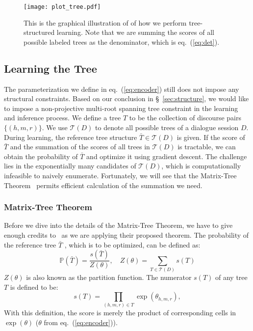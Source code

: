 \documentclass[11pt]{article}
\begin{document}
\begin{figure*}[]
\vspace{-0.8cm}
\texttt{[image: plot\_tree.pdf]}
\vspace{-0.8cm}
\caption{This is the graphical illustration of of how we perform tree-structured learning. Note that we are summing the scores of all possible labeled trees as the denominator, which is eq.~(\ref{eq:det}).}
\label{fig:tree_encoding}
\end{figure*}

\subsection{Learning the Tree}
\label{sec:learning}
The parameterization we define in eq.~(\ref{eq:encoder}) still does not impose any structural constraints. Based on our conclusion in \S~\ref{sec:structure}, we would like to impose a non-projective multi-root spanning tree constraint in the learning and inference process.
We define a tree $T$ to be the collection of discourse pairs $\{(h,m,r)\}$.
We use $\mathcal{T}(D)$ to denote all possible trees of a dialogue session $D$. During learning, the reference tree structure $\bar T\in \mathcal{T}(D)$ is given. If the score of $\bar T$ and the summation of the scores of all trees in $\mathcal{T}(D)$ is tractable, we can obtain the probability of $\bar T$ and optimize it using gradient descent.
The challenge lies in the exponentially many candidates of $\mathcal{T}(D)$, which is computationally infeasible to naively enumerate.
Fortunately, we will see that the Matrix-Tree Theorem~\cite{tutte1984graph,koo2007structured} permits efficient calculation of the summation we need.

\subsubsection{Matrix-Tree Theorem}
Before we dive into the details of the Matrix-Tree Theorem, we have to give enough credits to~\citet{tutte1984graph, koo2007structured} as we are applying their proposed theorem.
The probability of the reference tree $\bar T$ , which is to be optimized, can be defined as:
\begin{equation}
    \mathbb{P}(\bar T) = \frac{s(\bar T)}{Z(\theta)}, \quad Z(\theta) = \sum_{T\in \mathcal{T}(D)} s(T)
    \label{eq:p}
\end{equation}
$Z(\theta)$ is also known as the partition function.
The numerator $s(T)$ of any tree $T$ is defined to be:
\begin{equation}
    s(T) = \prod_{(h,m,r)\in T} \exp (\theta_{h,m,r}),
\end{equation}
With this definition, the score is merely the product of corresponding cells in $\exp(\theta)$ ($\theta$ from eq.~(\ref{eq:encoder})).
\end{document}
